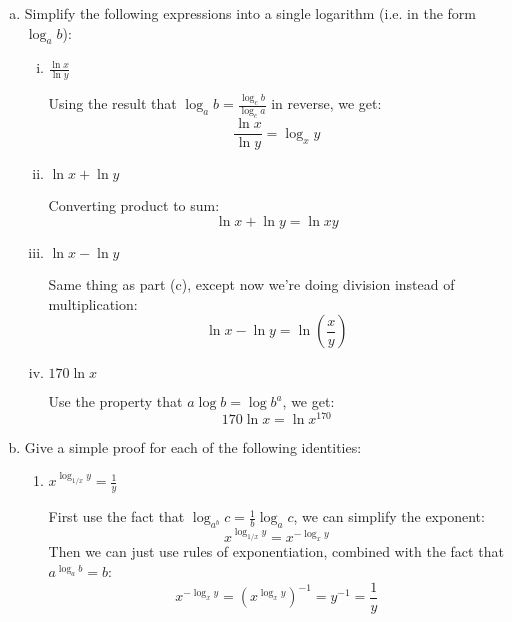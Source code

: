 \documentclass[11pt]{article}
\begin{document}
\begin{enumerate}[(a)]
    \item Simplify the following expressions into a single logarithm (i.e. in the form $\log_a b$):

    \begin{enumerate}[(i)]
        \item $\frac{\ln x}{\ln y}$ 

			\begin{solution}
				Using the result that $\log_a b = \frac{\log_c b}{\log_c a}$ in reverse, we get:
				\[
					\frac{\ln x}{\ln y} = \log_xy
				\] 
			\end{solution}
        
        \item $\ln x + \ln y$

			\begin{solution}
				Converting product to sum:
				\[
				\ln x + \ln y = \ln xy
				\] 
			\end{solution}
        
        \item $\ln x - \ln y$

			\begin{solution}
				Same thing as part (c), except now we're doing division instead of multiplication:
				\[
				\ln x - \ln y = \ln\left( \frac{x}{y} \right) 
				\] 
			\end{solution}

        \item $170 \ln x$ 

			\begin{solution}
				Use the property that $a \log b = \log b^a$, we get:
				\[
					170 \ln x = \ln x^{170}
				\] 
			\end{solution}

    \end{enumerate}
    
    \item Give a simple proof for each of the following identities:
    \begin{enumerate}
        \item $x^{\log_{1/x} y} = \frac{1}{y}$

			\begin{solution}
				First use the fact that $\log_{a^b} c = \frac{1}{b}\log_a c$, we can simplify the exponent:
				\[
					x^{\log_{1/x} y} = x^{-\log_x y}
				\] 
				Then we can just use rules of exponentiation, combined with the fact that $a^{\log_a b} = b$:
				\[
					x^{-\log_x y} = (x^{\log_x y})^{-1} = y^{-1} = \frac{1}{y}
				\] 
			\end{solution}


\end{enumerate}
\end{enumerate}
\end{document}
